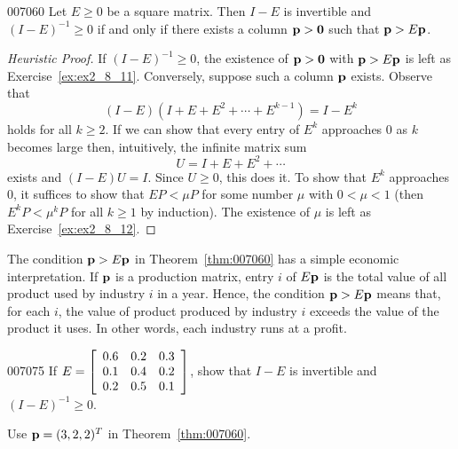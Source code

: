 \begin{theorem}{}{007060}
Let $E \geq 0$ be a square matrix. Then $I - E$ is invertible and $(I - E)^{-1} \geq 0$ if and only if there exists a column $\textbf{p} > \textbf{0}$ such that $\textbf{p} > E\textbf{p}$.
\end{theorem}

\begin{proof}[Heuristic Proof]

\noindent If $(I - E)^{-1} \geq 0$, the existence of $\textbf{p} > \textbf{0}$ with $\textbf{p} > E\textbf{p}$ is left as Exercise~\ref{ex:ex2_8_11}. Conversely, suppose such a column $\textbf{p}$ exists. Observe that
\begin{equation*}
(I - E)(I + E + E^2 + \cdots + E^{k-1}) = I - E^k
\end{equation*}
holds for all $k \geq 2$. If we can show that every entry of $E^{k}$ approaches $0$ as $k$ becomes large then, intuitively, the infinite matrix sum
\begin{equation*}
U = I + E + E^2 + \cdots
\end{equation*}
exists and $(I - E)U = I$. Since $U \geq 0$, this does it. To show that $E^{k}$ approaches $0$, it suffices to show that $EP < \mu P$ for some number $\mu$ with $0 < \mu < 1$ (then $E^{k}P < \mu^{k}P$ for all $k \geq 1$ by induction). The existence of $\mu$ is left as Exercise~\ref{ex:ex2_8_12}.
\end{proof}

The condition $\textbf{p} > E\textbf{p}$ in Theorem~\ref{thm:007060} has a simple economic interpretation. If $\textbf{p}$ is a production matrix, entry $i$ of $E\textbf{p}$ is the total value of all product used by industry $i$ in a year. Hence, the condition $\textbf{p} > E\textbf{p}$ means that, for each $i$, the value of product produced by industry $i$ exceeds the value of the product it uses. In other words, each industry runs at a profit.

\begin{example}{}{007075}
If $E = \left[ \begin{array}{rrr}
0.6 & 0.2 & 0.3 \\
0.1 & 0.4 & 0.2 \\
0.2 & 0.5 & 0.1
\end{array} \right]$,
 show that $I - E$ is invertible and $(I - E)^{-1} \geq 0$.


\begin{solution}
  Use $\textbf{p} = (3, 2, 2)^{T}$ in Theorem~\ref{thm:007060}.
\end{solution}
\end{example}

